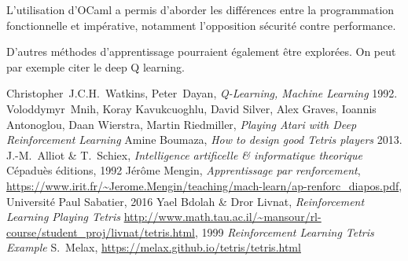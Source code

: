 \documentclass{report}
\begin{document}
L'utilisation d'OCaml a permis d'aborder les différences entre la programmation
fonctionnelle et impérative, notamment l'opposition sécurité contre performance.

D'autres méthodes d'apprentissage pourraient également être explorées. On peut
par exemple citer le deep Q learning\cite{deepmind}.

\begin{thebibliography}{9}
    Christopher~J.C.H.~Watkins, Peter~Dayan,
    \textit{Q-Learning, Machine Learning}
    1992.
    Voloddymyr~Mnih, Koray Kavukcuoghlu, David Silver, Alex Graves, Ioannis
    Antonoglou, Daan Wierstra, Martin Riedmiller,
    \textit{Playing Atari with Deep Reinforcement Learning}
    Amine Boumaza,
    \textit{How to design good Tetris players}
    2013.
    J.-M.~Alliot \& T.~Schiex,
    \textit{Intelligence artificelle \& informatique theorique}
    C\'epadu\`es \'editions, 1992
    J\'er\^ome Mengin,
    \textit{Apprentissage par renforcement},
    \url{https://www.irit.fr/~Jerome.Mengin/teaching/mach-learn/ap-renforc_diapos.pdf},
    Université Paul Sabatier, 2016
    Yael Bdolah \& Dror Livnat,
    \textit{Reinforcement Learning Playing Tetris}
    \url{http://www.math.tau.ac.il/~mansour/rl-course/student_proj/livnat/tetris.html},
    1999
    \textit{Reinforcement Learning Tetris Example}
    S.~Melax,
    \url{https://melax.github.io/tetris/tetris.html}
\end{thebibliography}
\end{document}
